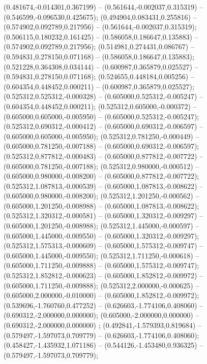  (0.481674,-0.014301,0.367199) -- (0.561644,-0.002037,0.315319) -- (0.546599,-0.096530,0.425675);
 (0.494904,0.083431,0.255816) -- (0.574902,0.092789,0.217956) -- (0.561644,-0.002037,0.315319);
 (0.506115,0.180232,0.161425) -- (0.586058,0.186647,0.135883) -- (0.574902,0.092789,0.217956);
 (0.514981,0.274431,0.086767) -- (0.594831,0.278150,0.071168) -- (0.586058,0.186647,0.135883);
 (0.521228,0.364308,0.034144) -- (0.600987,0.365879,0.025527) -- (0.594831,0.278150,0.071168);
 (0.524655,0.448184,0.005256) -- (0.604354,0.448452,0.000211) -- (0.600987,0.365879,0.025527);
 (0.525312,0.525312,-0.000328) -- (0.605000,0.525312,-0.005247) -- (0.604354,0.448452,0.000211);
 (0.525312,0.605000,-0.000372) -- (0.605000,0.605000,-0.005950) -- (0.605000,0.525312,-0.005247);
 (0.525312,0.690312,-0.000412) -- (0.605000,0.690312,-0.006597) -- (0.605000,0.605000,-0.005950);
 (0.525312,0.781250,-0.000449) -- (0.605000,0.781250,-0.007188) -- (0.605000,0.690312,-0.006597);
 (0.525312,0.877812,-0.000483) -- (0.605000,0.877812,-0.007722) -- (0.605000,0.781250,-0.007188);
 (0.525312,0.980000,-0.000512) -- (0.605000,0.980000,-0.008200) -- (0.605000,0.877812,-0.007722);
 (0.525312,1.087813,-0.000539) -- (0.605000,1.087813,-0.008622) -- (0.605000,0.980000,-0.008200);
 (0.525312,1.201250,-0.000562) -- (0.605000,1.201250,-0.008988) -- (0.605000,1.087813,-0.008622);
 (0.525312,1.320312,-0.000581) -- (0.605000,1.320312,-0.009297) -- (0.605000,1.201250,-0.008988);
 (0.525312,1.445000,-0.000597) -- (0.605000,1.445000,-0.009550) -- (0.605000,1.320312,-0.009297);
 (0.525312,1.575313,-0.000609) -- (0.605000,1.575312,-0.009747) -- (0.605000,1.445000,-0.009550);
 (0.525312,1.711250,-0.000618) -- (0.605000,1.711250,-0.009888) -- (0.605000,1.575312,-0.009747);
 (0.525312,1.852812,-0.000623) -- (0.605000,1.852812,-0.009972) -- (0.605000,1.711250,-0.009888);
 (0.525312,2.000000,-0.000625) -- (0.605000,2.000000,-0.010000) -- (0.605000,1.852812,-0.009972);
 (0.539696,-1.760760,0.477252) -- (0.626603,-1.774106,0.408060) -- (0.690312,-2.000000,0.000000);
 (0.605000,-2.000000,0.000000) -- (0.690312,-2.000000,0.000000) ;
 (0.492841,-1.579393,0.819684) -- (0.579497,-1.597073,0.709779) -- (0.626603,-1.774106,0.408060);
 (0.458427,-1.435932,1.071186) -- (0.544126,-1.453480,0.936325) -- (0.579497,-1.597073,0.709779);
